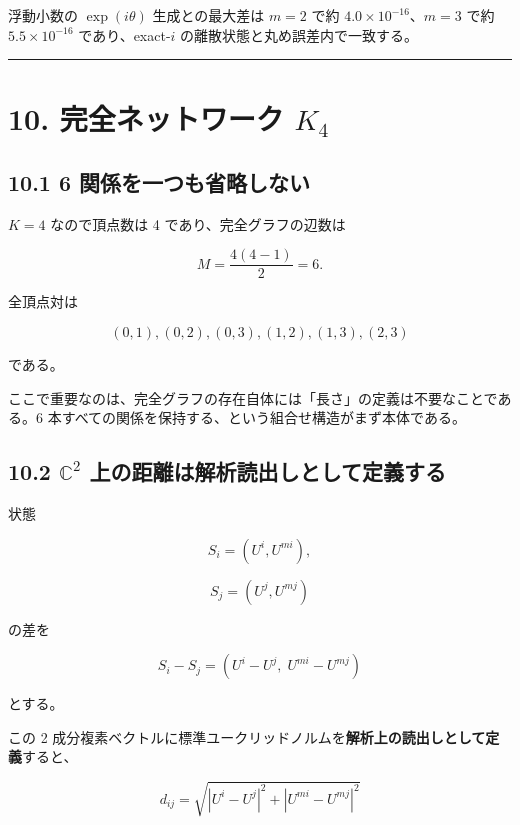 \documentclass[
  a4paper,
]{ltjsarticle}
\begin{document}
浮動小数の \(\exp(i\theta)\) 生成との最大差は \(m=2\) で約
\(4.0\times10^{-16}\)、\(m=3\) で約 \(5.5\times10^{-16}\)
であり、exact-\(i\) の離散状態と丸め誤差内で一致する。

\begin{center}\rule{0.5\linewidth}{0.5pt}\end{center}

\section{\texorpdfstring{10. 完全ネットワーク
\(K_4\)}{10. 完全ネットワーク K\_4}}\label{ux5b8cux5168ux30cdux30c3ux30c8ux30efux30fcux30af-k_4}

\subsection{10.1 6
関係を一つも省略しない}\label{ux95a2ux4fc2ux3092ux4e00ux3064ux3082ux7701ux7565ux3057ux306aux3044}

\(K=4\) なので頂点数は 4 であり、完全グラフの辺数は

\[
M
=
\frac{4(4-1)}{2}
=
6.
\]

全頂点対は

\[
(0,1),
(0,2),
(0,3),
(1,2),
(1,3),
(2,3)
\]

である。

ここで重要なのは、完全グラフの存在自体には「長さ」の定義は不要なことである。6
本すべての関係を保持する、という組合せ構造がまず本体である。

\subsection{\texorpdfstring{10.2 \(\mathbb C^2\)
上の距離は解析読出しとして定義する}{10.2 \textbackslash mathbb C\^{}2 上の距離は解析読出しとして定義する}}\label{mathbb-c2-ux4e0aux306eux8dddux96e2ux306fux89e3ux6790ux8aadux51faux3057ux3068ux3057ux3066ux5b9aux7fa9ux3059ux308b}

状態

\[
S_i=(U^i,U^{mi}),
\]

\[
S_j=(U^j,U^{mj})
\]

の差を

\[
S_i-S_j
=
(U^i-U^j,\;U^{mi}-U^{mj})
\]

とする。

この 2
成分複素ベクトルに標準ユークリッドノルムを\textbf{解析上の読出しとして定義}すると、

\[
\boxed{
d_{ij}
=
\sqrt{
|U^i-U^j|^2
+
|U^{mi}-U^{mj}|^2
}
}
\]
\end{document}
